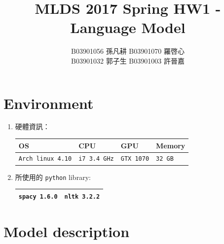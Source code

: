 \documentclass[12pt, a4paper]{article}
\title{MLDS 2017 Spring HW1 - Language Model}
\author{B03901056 孫凡耕 B03901070 羅啓心\\
        B03901032 郭子生 B03901003 許晉嘉}
\date{\vspace{-5ex}}
\theoremstyle{mystyle}	%
\begin{document}
\maketitle 
\thispagestyle{empty}
\section{Environment}
\begin{enumerate}
  \item 硬體資訊： 
    \begin{tabular}{|C{4cm}|C{3cm}|C{3cm}|C{3cm}|}
      \hline
      OS & CPU & GPU & Memory \\
      \hline
      \texttt{Arch linux 4.10} & \texttt{i7 3.4 GHz} &
      \texttt{GTX 1070}  & \texttt{32 GB}  \\
      \hline
    \end{tabular}
  \item 所使用的 \texttt{python} library:
    \begin{tabular}{|c|c|}
      \hline
      \texttt{spacy 1.6.0} & \texttt{nltk 3.2.2} \\
      \hline
    \end{tabular}
\end{enumerate}

\section{Model description}
\end{document}
